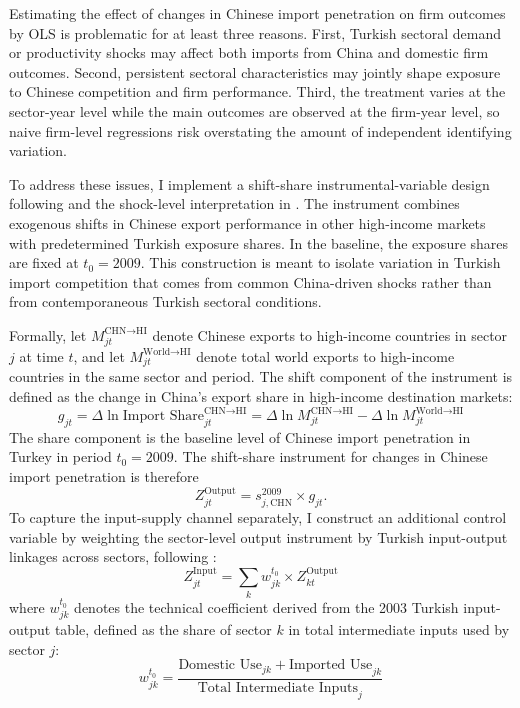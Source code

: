 \documentclass[12pt]{article}
\begin{document}
Estimating the effect of changes in Chinese import penetration on firm outcomes by OLS is problematic for at least three reasons. First, Turkish sectoral demand or productivity shocks may affect both imports from China and domestic firm outcomes. Second, persistent sectoral characteristics may jointly shape exposure to Chinese competition and firm performance. Third, the treatment varies at the sector-year level while the main outcomes are observed at the firm-year level, so naive firm-level regressions risk overstating the amount of independent identifying variation.

To address these issues, I implement a shift-share instrumental-variable design following \textcite{autorTradeAdjustmentWorkerLevel2014} and the shock-level interpretation in \textcite{borusyakQuasiExperimentalShiftShareResearch2022}. The instrument combines exogenous shifts in Chinese export performance in other high-income markets with predetermined Turkish exposure shares. In the baseline, the exposure shares are fixed at $t_0 = 2009$. This construction is meant to isolate variation in Turkish import competition that comes from common China-driven shocks rather than from contemporaneous Turkish sectoral conditions.

Formally, let $M_{jt}^{\text{CHN} \to \text{HI}}$ denote Chinese exports to high-income countries in sector $j$ at time $t$, and let $M_{jt}^{\text{World} \to \text{HI}}$ denote total world exports to high-income countries in the same sector and period. The shift component of the instrument is defined as the change in China’s export share in high-income destination markets:
\[
g_{jt} = \Delta \ln \text{Import Share}_{jt}^{\text{CHN} \to \text{HI}} = \Delta \ln M_{jt}^{\text{CHN} \to \text{HI}} - \Delta \ln M_{jt}^{\text{World} \to \text{HI}}
\]
The share component is the baseline level of Chinese import penetration in Turkey in period $t_0 = 2009$. The shift-share instrument for changes in Chinese import penetration is therefore
\[
Z_{jt}^{\text{Output}} = s_{j,\text{CHN}}^{2009} \times g_{jt}.
\]
To capture the input-supply channel separately, I construct an additional control variable by weighting the sector-level output instrument by Turkish input-output linkages across sectors, following \textcite{amitiTradeLiberalizationIntermediate2007}:
\[
Z_{jt}^{\text{Input}} = \sum_k w_{jk}^{t_0} \times Z_{kt}^{\text{Output}}
\]
where $w_{jk}^{t_0}$ denotes the technical coefficient derived from the 2003 Turkish input-output table, defined as the share of sector $k$ in total intermediate inputs used by sector $j$:
\[
w_{jk}^{t_0} = \frac{\text{Domestic Use}_{jk} + \text{Imported Use}_{jk}}{\text{Total Intermediate Inputs}_j}
\]
\end{document}
